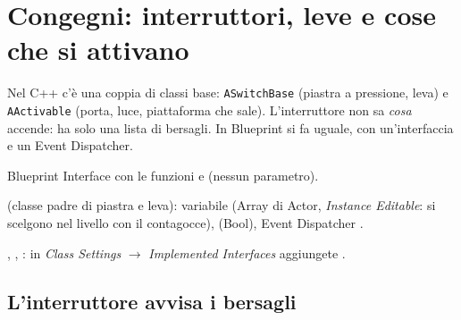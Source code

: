 \section{Congegni: interruttori, leve e cose che si attivano}

Nel C++ c'è una coppia di classi base: \texttt{ASwitchBase} (piastra a pressione, leva) e \texttt{AActivable} (porta, luce, piattaforma che sale). L'interruttore non sa \emph{cosa} accende: ha solo una lista di bersagli. In Blueprint si fa uguale, con un'interfaccia e un Event Dispatcher.

\begin{ricetta}
  \item Blueprint Interface  con le funzioni  e  (nessun parametro).
  \item {} (classe padre di piastra e leva): variabile  (Array di Actor, \emph{Instance Editable}: si scelgono nel livello con il contagocce),  (Bool), Event Dispatcher .
  \item {}, , : in \emph{Class Settings} $\rightarrow$ \emph{Implemented Interfaces} aggiungete .
\end{ricetta}

\subsection{L'interruttore avvisa i bersagli}

\begin{bpgraph}
\end{bpgraph}

